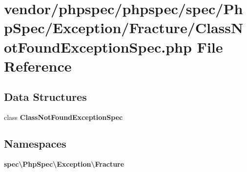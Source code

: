 \section{vendor/phpspec/phpspec/spec/\+Php\+Spec/\+Exception/\+Fracture/\+Class\+Not\+Found\+Exception\+Spec.php File Reference}
\label{phpspec_2spec_2_php_spec_2_exception_2_fracture_2_class_not_found_exception_spec_8php}
\subsection*{Data Structures}
\begin{DoxyCompactItemize}
\item 
class {\bf Class\+Not\+Found\+Exception\+Spec}
\end{DoxyCompactItemize}
\subsection*{Namespaces}
\begin{DoxyCompactItemize}
\item 
 {\bf spec\textbackslash{}\+Php\+Spec\textbackslash{}\+Exception\textbackslash{}\+Fracture}
\end{DoxyCompactItemize}
